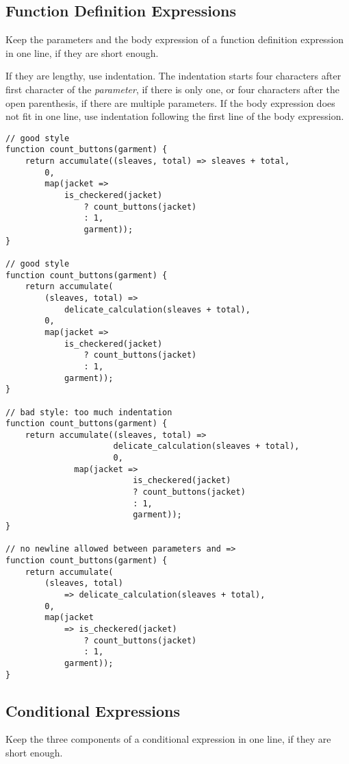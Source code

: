 \subsection*{Function Definition Expressions}

Keep the parameters and the body expression of a function definition expression
in one line, if they are short enough.

If they are lengthy, use
indentation. The indentation starts four characters after first character of
the \textit{parameter}, if there is only one,
or four characters after the open parenthesis,
if there are multiple parameters. If the body expression does not
fit in one line, use indentation following the first line of the body
expression. 

\begin{lstlisting}
// good style
function count_buttons(garment) {
    return accumulate((sleaves, total) => sleaves + total,
        0, 
        map(jacket =>
            is_checkered(jacket)
                ? count_buttons(jacket)
                : 1,
                garment));
}

// good style
function count_buttons(garment) {
    return accumulate(
        (sleaves, total) =>
            delicate_calculation(sleaves + total),
        0,
        map(jacket =>
            is_checkered(jacket)
                ? count_buttons(jacket)
                : 1,
            garment));
}

// bad style: too much indentation
function count_buttons(garment) {
    return accumulate((sleaves, total) =>
                      delicate_calculation(sleaves + total),
                      0, 
		      map(jacket =>
                          is_checkered(jacket)
                          ? count_buttons(jacket)
                          : 1,
                          garment));
}

// no newline allowed between parameters and =>
function count_buttons(garment) {
    return accumulate(
        (sleaves, total) 
            => delicate_calculation(sleaves + total),
        0,
        map(jacket 
            => is_checkered(jacket)
                ? count_buttons(jacket)
                : 1,
            garment));
}
\end{lstlisting}


  \subsection*{Conditional Expressions}
\label{condex}
Keep the three components of a conditional expression in one line, if they are short enough.


